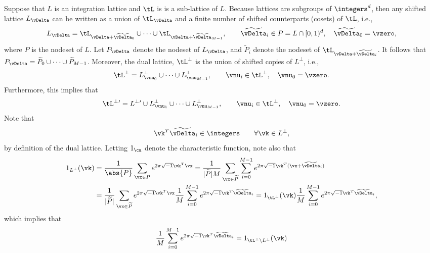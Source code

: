 \documentclass[12pt]{amsart}
\newcommand{\cubed}{[0,1)^d}
\newcommand{\tP}{\widetilde{P}}
\newcommand{\tvDelta}{\widetilde{\vDelta}}
\theoremstyle{definition}
\begin{document}
Suppose that $L$ is an integration lattice and $\tL$ is is a sub-lattice of $L$.  Because lattices are subgroups of $\integers^d$, then any shifted lattice $L_\vDelta$ can be written as a union of $\tL_{\vDelta}$ and a finite number of shifted counterparts (cosets) of $\tL$, i.e.,  
\[
L_{\vDelta} = \tL_{\vDelta+\tvDelta_0} \cup \cdots \cup \tL_{\vDelta+ \tvDelta_{M-1}}, \qquad \tvDelta_i \in P = L \cap \cubed, \quad \tvDelta_0=\vzero, 
\]
where $P$ is the nodeset of $L$.  Let $P_{\vDelta}$ denote the nodeset of $L_{\vDelta}$, and $\tP_{i}$ denote the nodeset of $\tL_{\vDelta + \tvDelta_{i}}$.  It follows that $P_{\vDelta} = \tP_{0} \cup \cdots \cup \tP_{M-1}$.  Moreover, the dual lattice, $\tL^{\perp}$ is the union of shifted copies of $L^{\perp}$, i.e.,
\[
\tL^{\perp} = L_{\vnu_0}^{\perp} \cup \cdots \cup L_{\vnu_{M-1}}^{\perp}, \qquad \vnu_i \in \tL^{\perp}, \quad \vnu_0 = \vzero.
\] 
Furthermore, this implies that
\[
\tL^{\perp}{}' = L^{\perp}{}' \cup L_{\vnu_1}^{\perp} \cup \cdots \cup L_{\vnu_{M-1}}^{\perp}, \qquad \vnu_i \in \tL^{\perp}, \quad \vnu_0 = \vzero.
\] 
Note that
\begin{equation} \label{latprop1}
\vk^T \tvDelta_i \in \integers \qquad \forall \vk \in L^{\perp}, 
\end{equation}
by definition of the dual lattice.  Letting $1_{\ca}$ denote the characteristic function, note also that
\begin{align*}
1_{L^{\perp}}(\vk) 
&= \frac{1}{\abs{P}}\sum_{\vx \in P} e^{2 \pi \sqrt{-1} \vk^T\vx} 
= \frac{1}{\lvert \tP \rvert M}\sum_{\vx \in \tP} \sum_{i=0}^{M-1} e^{2 \pi \sqrt{-1}\vk^T(\vx+\tvDelta_i)}  \\
& = \frac{1}{\lvert \tP \rvert}\sum_{\vx \in \tP} e^{2 \pi \sqrt{-1} \vk^T\vx} \frac{1}{M} \sum_{i=0}^{M-1} e^{2 \pi \sqrt{-1} \vk^T\tvDelta_i}
= 1_{\tL^{\perp}}(\vk) \frac{1}{M} \sum_{i=0}^{M-1} e^{2 \pi \sqrt{-1} \vk^T\tvDelta_i},
\end{align*}
which implies that
\begin{equation} \label{latprop2}
\frac{1}{M} \sum_{i=0}^{M-1} e^{2 \pi \sqrt{-1} \vk^T\tvDelta_i} = 1_{\tL^{\perp}\setminus L^{\perp}}(\vk)
\end{equation}
\end{document}
